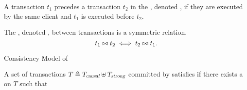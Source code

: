 \begin{frame}{}
  \begin{definition}
    A transaction $t_{1}$ precedes a transaction $t_{2}$
    in the , denoted ,
    if they are executed by the same client and $t_{1}$ is executed before $t_{2}$.
  \end{definition}

  \vspace{0.60cm}
  \begin{definition}
    The , denoted \red{$\conflict$},
    between transactions is a symmetric relation.
    \[
      t_{1} \bowtie t_{2} \iff t_{2} \bowtie t_{1}.
    \]
  \end{definition}
\end{frame}

\begin{frame}{Consistency Model of \unistore}
  \begin{definition}[\por]
    A set of transactions $T \triangleq T_{\textsl{causal}} \uplus T_{\textsl{strong}}$
    committed by \unistore{} satisfies \blue{\por{}}
    if there exists a  on $T$ such that

    \vspace{0.30cm}
    \begin{description}[\ev:]
      \setlength{\itemsep}{8pt}
      \item[\causalityaxiom:]
      \item[\conflictaxiom:]
      \item[\ev:]
      \item[\retval:]
    \end{description}
  \end{definition}
\end{frame}

